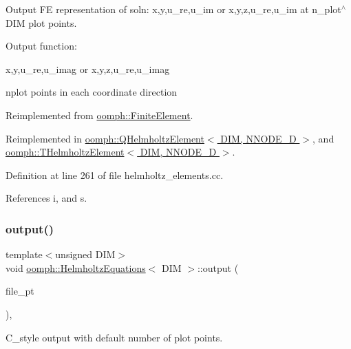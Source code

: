 Output FE representation of soln\+: x,y,u\+\_\+re,u\+\_\+im or x,y,z,u\+\_\+re,u\+\_\+im at n\+\_\+plot$^\wedge$\+D\+IM plot points. 

Output function\+:

x,y,u\+\_\+re,u\+\_\+imag or x,y,z,u\+\_\+re,u\+\_\+imag

nplot points in each coordinate direction 

Reimplemented from \hyperlink{classoomph_1_1FiniteElement_afa9d9b2670f999b43e6679c9dd28c457}{oomph\+::\+Finite\+Element}.



Reimplemented in \hyperlink{classoomph_1_1QHelmholtzElement_ac05323b02dc7d06f506ade8078fa2356}{oomph\+::\+Q\+Helmholtz\+Element$<$ D\+I\+M, N\+N\+O\+D\+E\+\_\+D $>$}, and \hyperlink{classoomph_1_1THelmholtzElement_ad16215e9aac2518284b9e5a0b8b535d1}{oomph\+::\+T\+Helmholtz\+Element$<$ D\+I\+M, N\+N\+O\+D\+E\+\_\+D $>$}.



Definition at line 261 of file helmholtz\+\_\+elements.\+cc.



References i, and s.

\mbox{\label{classoomph_1_1HelmholtzEquations_a4ff9181e482ccaf3ae94b452e0efa9a1}} 
\subsubsection{\texorpdfstring{output()}{output()}\hspace{0.1cm}{\footnotesize\ttfamily [3/4]}}
{\footnotesize\ttfamily template$<$unsigned D\+IM$>$ \\
void \hyperlink{classoomph_1_1HelmholtzEquations}{oomph\+::\+Helmholtz\+Equations}$<$ D\+IM $>$\+::output (\begin{DoxyParamCaption}\item[{F\+I\+LE $\ast$}]{file\+\_\+pt }\end{DoxyParamCaption})\hspace{0.3cm}{\ttfamily [inline]}, {\ttfamily [virtual]}}



C\+\_\+style output with default number of plot points. 




